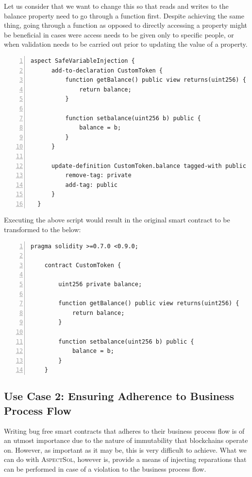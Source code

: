 \documentclass{article}
\newcommand{\AspectSol}{\textsc{AspectSol}\xspace}
\begin{document}
Let us consider that we want to change this so that reads and writes to the balance property need to go through a function first. Despite achieving the same thing, going through a function as opposed to directly accessing a property might be beneficial in cases were access needs to be given only to specific people, or when validation needs to be carried out prior to updating the value of a property.

\small\begin{lstlisting}[language=Solidity,numbers=left,numbersep=2pt,xleftmargin=0.3cm,label={code:safeVariableAspectSolScript}, caption={Safe Variable \AspectSol Script}]
  aspect SafeVariableInjection {					
      add-to-declaration CustomToken {
          function getBalance() public view returns(uint256) {
              return balance;
          }
      
          function setbalance(uint256 b) public {
              balance = b;
          }
      }
      
      update-definition CustomToken.balance tagged-with public {
          remove-tag: private
          add-tag: public
      }
  }
\end{lstlisting}\normalsize
	
Executing the above script would result in the original smart contract to be transformed to the below:

\small\begin{lstlisting}[language=Solidity,numbers=left,numbersep=2pt,xleftmargin=0.3cm,label={code:safeVariableContract}, caption={Safe Variable Smart Contract.}]
	pragma solidity >=0.7.0 <0.9.0;
	
	contract CustomToken {
		
		uint256 private balance;
		
		function getBalance() public view returns(uint256) {
			return balance;
		}
		
		function setbalance(uint256 b) public {
			balance = b;
		}
	}
\end{lstlisting}\normalsize

\subsection{Use Case 2: Ensuring Adherence to Business Process Flow}

Writing bug free smart contracts that adheres to their business process flow is of an utmost importance due to the nature of immutability that blockchains operate on. However, as important as it may be, this is very difficult to achieve. What we can do with \AspectSol, however is, provide a means of injecting reparations that can be performed in case of a violation to the business process flow.
\end{document}
